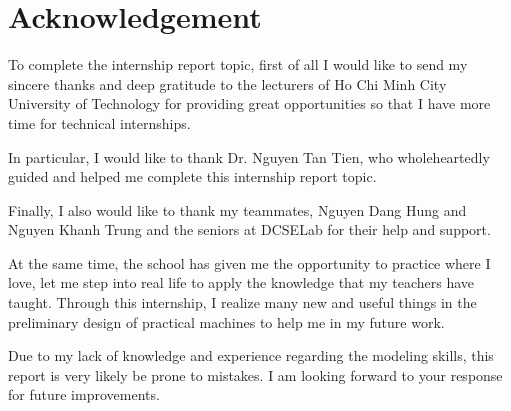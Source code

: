 \chapter*{Acknowledgement}
	
	To complete the internship report topic, first of all I would like to send my sincere thanks and deep gratitude to the lecturers of Ho Chi Minh City University of Technology for providing great opportunities so that I have more time for technical internships.
	
	In particular, I would like to thank Dr. Nguyen Tan Tien, who wholeheartedly guided and helped me complete this internship report topic.
	
	Finally, I also would like to thank my teammates, Nguyen Dang Hung and Nguyen Khanh Trung and the seniors at DCSELab for their help and support.
	
	At the same time, the school has given me the opportunity to practice where I love, let me step into real life to apply the knowledge that my teachers have taught. Through this internship, I realize many new and useful things in the preliminary design of practical machines to help me in my future work.
	
	Due to my lack of knowledge and experience regarding the modeling skills, this report is very likely be prone to mistakes. I am looking forward to your response for future improvements.